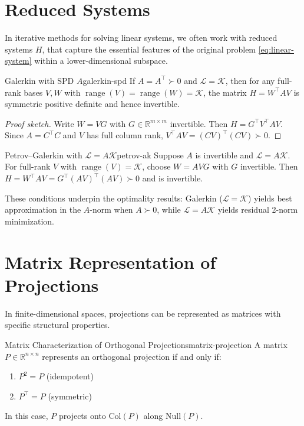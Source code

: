 \documentclass[../../main.tex]{subfiles}
\begin{document}
\section{Reduced Systems}
In iterative methods for solving linear systems, we often work with reduced systems $H$, that capture the essential features of the original problem \eqref{eq:linear-system} within a lower-dimensional subspace.

\begin{proposition}{Galerkin with SPD $A$}{galerkin-spd}
    If $A=A^\top\succ0$ and $\mathcal{L}=\mathcal{K}$, then for any full-rank bases $V,W$ with $\operatorname{range}(V)=\operatorname{range}(W)=\mathcal{K}$, the matrix $H=W^\top A V$ is symmetric positive definite and hence invertible.
\end{proposition}
\begin{proof}[Proof sketch]
    Write $W=VG$ with $G\in\mathbb{R}^{m\times m}$ invertible. Then $H=G^\top V^\top A V$. Since $A=C^\top C$ and $V$ has full column rank, $V^\top A V=(CV)^\top(CV)\succ0$.
\end{proof}

\begin{proposition}{Petrov--Galerkin with $\mathcal{L}=A\mathcal{K}$}{petrov-ak}
    Suppose $A$ is invertible and $\mathcal{L}=A\mathcal{K}$. For full-rank $V$ with $\operatorname{range}(V)=\mathcal{K}$, choose $W=AVG$ with $G$ invertible. Then $H=W^\top A V = G^\top (AV)^\top(AV)\succ0$ and is invertible.
\end{proposition}

These conditions underpin the optimality results: Galerkin ($\mathcal{L}=\mathcal{K}$) yields best approximation in the $A$-norm when $A\succ0$, while $\mathcal{L}=A\mathcal{K}$ yields residual 2-norm minimization.

\section{Matrix Representation of Projections}

In finite-dimensional spaces, projections can be represented as matrices with specific structural properties.

\begin{theorem}{Matrix Characterization of Orthogonal Projections}{matrix-projection}
    A matrix $P  \in  \mathbb{R}^{n \times n}$ represents an orthogonal projection if and only if:
    \begin{enumerate}
        \item $P^2 = P$ (idempotent)
        \item $P^{\top} = P$ (symmetric)
    \end{enumerate}
    In this case, $P$ projects onto $\text{Col}(P)$ along $\text{Null}(P)$.
\end{theorem}
\end{document}
